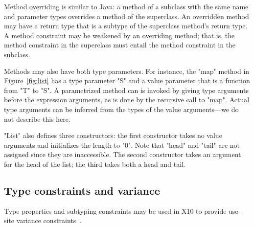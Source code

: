 \documentclass[preprint,nocopyrightspace,9pt]{sigplanconf}
\begin{document}
Method overriding is similar to Java: a method of a subclass
with the same name and parameter types overrides a method of the
superclass.  An overridden method may have a return type that is
a subtype of the superclass method's return type.
A method constraint may be weakened by an overriding
method; that is, the method constraint in the superclass must entail the  
method constraint in the subclass.

Methods may also have both type parameters.  
For instance, the \xcd"map" method in Figure~\ref{fig:list} 
has a type parameter \xcd"S" and a value parameter that is a
function from \xcd"T" to \xcd"S".
A parametrized method can is invoked by giving type arguments before the
expression arguments, as is done by the recursive call to
\xcd"map".  Actual type arguments can be inferred from the types
of the value arguments---we do not describe this here.

\xcd"List" also defines three constructors: the first
constructor takes no value arguments and initializes
the length to \xcd"0".  Note that \xcd"head" and \xcd"tail" are
not assigned since they are inaccessible.
The second constructor takes an argument for the head of the
list; the third takes both a head and tail.

\subsection{Type constraints and variance}
\label{sec:variance}

Type properties and subtyping constraints may be used in X10 to 
provide use-site variance
constraints~\cite{variant-parametric-types}.
\end{document}
